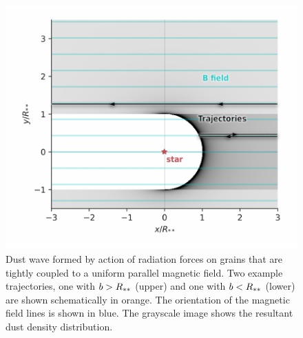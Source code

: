 \begin{figure}
  \centering
  \includegraphics[width=\linewidth]{figs/parallel-bfield-dust-wave-inertia}
  \caption{Dust wave formed by action of radiation forces on grains
    that are tightly coupled to a uniform parallel magnetic field.
    Two example trajectories, one with \(b > R_{**}\) (upper) and
    one with \(b < R_{**}\) (lower) are shown schematically in
    orange.  The orientation of the magnetic field lines is shown in
    blue.  The grayscale image shows the resultant dust density
    distribution.}
  \label{fig:inertia-thB0}
\end{figure}

